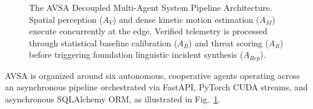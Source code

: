 \documentclass[conference]{IEEEtran}
\begin{document}
\begin{figure}[t]
\centering
{}
\caption{The AVSA Decoupled Multi-Agent System Pipeline Architecture. Spatial perception ($A_V$) and dense kinetic motion estimation ($A_M$) execute concurrently at the edge. Verified telemetry is processed through statistical baseline calibration ($A_B$) and threat scoring ($A_R$) before triggering foundation linguistic incident synthesis ($A_{Rep}$).}
\label{fig:architecture}
\end{figure}

AVSA is organized around six autonomous, cooperative agents operating across an asynchronous pipeline orchestrated via FastAPI, PyTorch CUDA streams, and asynchronous SQLAlchemy ORM, as illustrated in Fig.~\ref{fig:architecture}.
\end{document}
